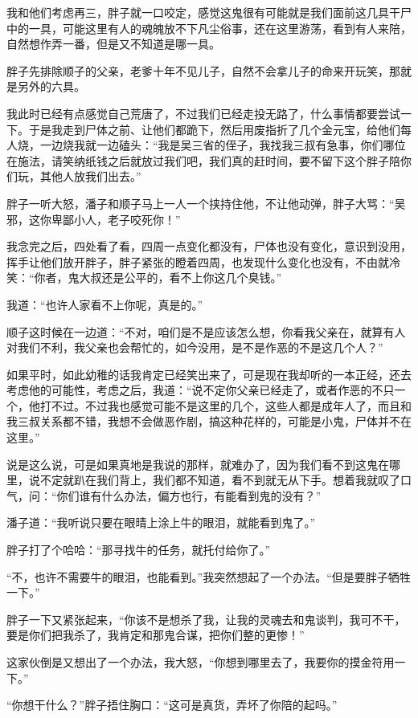 我和他们考虑再三，胖子就一口咬定，感觉这鬼很有可能就是我们面前这几具干尸中的一具，可能这里有人的魂魄放不下凡尘俗事，还在这里游荡，看到有人来陪，自然想作弄一番，但是又不知道是哪一具。

胖子先排除顺子的父亲，老爹十年不见儿子，自然不会拿儿子的命来开玩笑，那就是另外的六具。

我此时已经有点感觉自己荒唐了，不过我们已经走投无路了，什么事情都要尝试一下。于是我走到尸体之前、让他们都跪下，然后用废指折了几个金元宝，给他们每人烧，一边烧我就一边磕头：“我是吴三省的侄子，我找我三叔有急事，你们哪位在施法，请笑纳纸钱之后就放过我们吧，我们真的赶时间，要不留下这个胖子陪你们玩，其他人放我们出去。”

胖子一听大怒，潘子和顺子马上一人一个挟持住他，不让他动弹，胖子大骂：“吴邪，这你卑鄙小人，老子咬死你！”

我念完之后，四处看了看，四周一点变化都没有，尸体也没有变化，意识到没用，挥手让他们放开胖子，胖子紧张的瞪着四周，也发现什么变化也没有，不由就冷笑：“你者，鬼大叔还是公平的，看不上你这几个臭钱。”

我道：“也许人家看不上你呢，真是的。”

顺子这时候在一边道：“不对，咱们是不是应该怎么想，你看我父亲在，就算有人对我们不利，我父亲也会帮忙的，如今没用，是不是作恶的不是这几个人？”

如果平时，如此幼稚的话我肯定已经笑出来了，可是现在我却听的一本正经，还去考虑他的可能性，考虑之后，我道：“说不定你父亲已经走了，或者作恶的不只一个，他打不过。不过我也感觉可能不是这里的几个，这些人都是成年人了，而且和我三叔关系都不错，我想不会做恶作剧，搞这种花样的，可能是小鬼，尸体并不在这里。”

说是这么说，可是如果真地是我说的那样，就难办了，因为我们看不到这鬼在哪里，说不定就趴在我们背上，我们都不知道，看不到就无从下手。想着我就叹了口气，问：“你们谁有什么办法，偏方也行，有能看到鬼的没有？”

潘子道：“我听说只要在眼晴上涂上牛的眼泪，就能看到鬼了。”

胖子打了个哈哈：“那寻找牛的任务，就托付给你了。”

“不，也许不需要牛的眼泪，也能看到。”我突然想起了一个办法。“但是要胖子牺牲一下。”

胖子一下又紧张起来，“你该不是想杀了我，让我的灵魂去和鬼谈判，我可不干，要是你们把我杀了，我肯定和那鬼合谋，把你们整的更惨！”

这家伙倒是又想出了一个办法，我大怒，“你想到哪里去了，我要你的摸金符用一下。”

“你想干什么？”胖子捂住胸口：“这可是真货，弄坏了你陪的起吗。”

